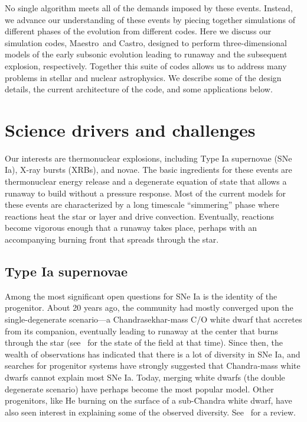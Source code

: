 \documentclass[a4paper]{jpconf}
\newcommand{\maestro}{{\sffamily Maestro}}
\newcommand{\castro}{{\sffamily Castro}}
\begin{document}
No single algorithm meets all of the demands imposed by these events.
Instead, we advance our understanding of these events by piecing
together simulations of different phases of the evolution from
different codes.  Here we discuss our simulation codes, \maestro\ and
\castro, designed to perform three-dimensional models of the early
subsonic evolution leading to runaway and the subsequent explosion,
respectively.  Together this suite of codes allows us to address many
problems in stellar and nuclear astrophysics.  We describe some of the
design details, the current architecture of the code, and some
applications below.

\section{Science drivers and challenges}

Our interests are thermonuclear explosions, including Type Ia
supernovae (SNe Ia), X-ray bursts (XRBs), and novae.  The basic
ingredients for these events are thermonuclear energy release and a
degenerate equation of state that allows a runaway to build without a
pressure response.  Most of the current models for these events are
characterized by a long timescale ``simmering'' phase where reactions
heat the star or layer and drive convection.  Eventually, reactions
become vigorous enough that a runaway takes place, perhaps with an
accompanying burning front that spreads through the star.

\subsection{Type Ia supernovae}

Among the most significant open questions for SNe Ia is the identity of the
progenitor.  About 20 years ago, the community had
mostly converged upon the single-degenerate scenario---a
Chandrasekhar-mass C/O white dwarf that accretes from its companion,
eventually leading to runaway at the center that burns through the
star (see~\cite{hillebrandtniemeyer2000} for the state of the field at
that time).  Since then, the wealth of observations has indicated that
there is a lot of diversity in SNe Ia, and searches for progenitor
systems have strongly suggested that Chandra-mass white dwarfs cannot
explain most SNe Ia.  Today, merging white dwarfs (the double
degenerate scenario) have perhaps become the most popular model.
Other progenitors, like He burning on the surface of a sub-Chandra
white dwarf, have also seen interest in explaining some of the observed
diversity.  See~\cite{araa-maoz} for a review.
\end{document}
